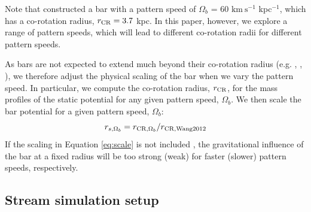 \documentclass[twocolumn]{aastex62}
\newcommand{\msun}{\textrm{M}_\odot}
\newcommand{\kms}{\ensuremath{\textrm{km}~\textrm{s}^{-1}}}
\newcommand{\todo}[1]{{\color{red} TODO: #1}}
\begin{document}
Note that \citet{wang:2012} constructed a bar with a pattern speed of $\Omega_b$ =  60 $\kms$ kpc$^{-1}$, which has a co-rotation radius, $r_{\rm CR} = 3.7$ kpc.
In this paper, however, we explore a range of pattern speeds, which will lead to different co-rotation radii for different pattern speeds. %

As bars are not expected to extend much beyond their co-rotation radius (e.g. \citealt{Debattista:2002}, \citealt{Debattista:2002b}, \citealt{weiner:1999}), we therefore adjust the physical scaling of the bar when we vary the pattern speed. %
In particular, we compute the co-rotation radius, $r_{\rm CR}$, for the mass profiles of the static potential for any given pattern speed, $\Omega_b$.
We then scale the bar potential for a given pattern speed, $\Omega_b$:
\begin{equation}\label{eq:scale}
r_{s, \Omega_b}  = r_{{\rm CR}, \Omega_b}/r_{{\rm CR, Wang 2012}}
\end{equation}
If the scaling in Equation \ref{eq:scale} is not included \citep[as in, e.g.,][]{Pearson:2017, Erkal:2017, Banik:2019}, the gravitational influence of the bar at a fixed radius will be too strong (weak) for faster (slower) pattern speeds, respectively.

%


\subsection{Stream simulation setup}
\label{sec:modeling}
\end{document}
